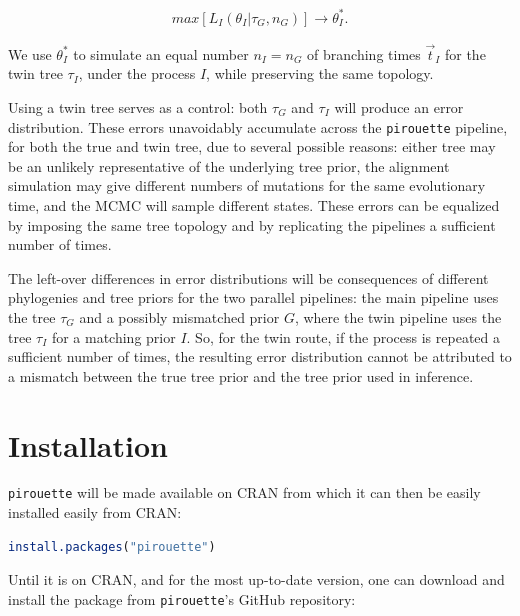 \begin{align}
    max[L_{\mathit{I}}(\theta_{\mathit{I}}|\tau_{\mathit{G}}, n_{\mathit{G}})] 
\rightarrow \theta^{*}_{\mathit{I}}.
\end{align}

We use $\theta^{*}_{\mathit{I}}$ to simulate an equal number 
$n_{\mathit{I}} = n_{\mathit{G}}$ 
of branching times $\Vec{t}_{\mathit{I}}$ for the twin tree 
$\tau_{\mathit{I}}$, under the process $\mathit{I}$, 
while preserving the same topology.

Using a twin tree serves as a control: both $\tau_{\mathit{G}}$ and 
$\tau_{\mathit{I}}$ will produce an error distribution. 
These errors unavoidably accumulate across the \verb;pirouette; pipeline,
for both the true and twin tree, due to several possible reasons: either tree may be an unlikely representative
of the underlying tree prior, the alignment simulation may give different
numbers of mutations for the same evolutionary time, 
and the MCMC will sample different states.
These errors can be equalized by imposing the same tree topology and by
replicating the pipelines a sufficient number of times.

The left-over differences in error distributions will be 
consequences of different phylogenies and tree priors for the two parallel 
pipelines: the main pipeline uses the tree $\tau_{\mathit{G}}$ and a
possibly mismatched prior $\mathit{G}$, where the twin pipeline
uses the tree $\tau_{\mathit{I}}$ for a matching prior $\mathit{I}$.
So, for the twin route, if the process is repeated a sufficient number of times, the resulting error distribution cannot be 
attributed to a mismatch between the true tree prior and the tree prior used in
inference.

\section{Installation}

\verb;pirouette; will be made available on CRAN from which it can then be easily installed easily from CRAN:
\begin{lstlisting}[language=R, floatplacement=ht, frame=single]
install.packages("pirouette")
\end{lstlisting}

Until it is on CRAN, and for the most up-to-date version, 
one can download and install the package from \verb;pirouette;'s GitHub 
repository:

